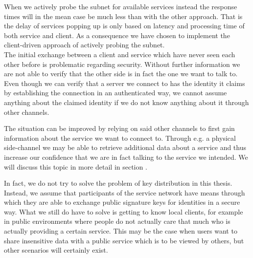 When we actively probe the subnet for available services instead the response times will in the mean case be much less than with the other approach.
That is the delay of services popping up is only based on latency and processing time of both service and client.
As a consequence we have chosen to implement the client-driven approach of actively probing the subnet.\\

The initial exchange between a client and service which have never seen each other before is problematic regarding security.
Without further information we are not able to verify that the other side is in fact the one we want to talk to.
Even though we can verify that a server we connect to has the identity it claims by establishing the connection in an authenticated way, we cannot assume anything about the claimed identity if we do not know anything about it through other channels.

The situation can be improved by relying on said other channels to first gain information about the service we want to connect to.
Through e.g. a physical side-channel we may be able to retrieve additional data about a service and thus increase our confidence that we are in fact talking to the service we intended.
We will discuss this topic in more detail in section \label{sec:key-exchaneg}.

In fact, we do not try to solve the problem of key distribution in this thesis.
Instead, we assume that participants of the service network have means through which they are able to exchange public signature keys for identities in a secure way.
What we still do have to solve is getting to know local clients, for example in public environments where people do not actually care that much who is actually providing a certain service.
This may be the case when users want to share insensitive data with a public service which is to be viewed by others, but other scenarios will certainly exist.

